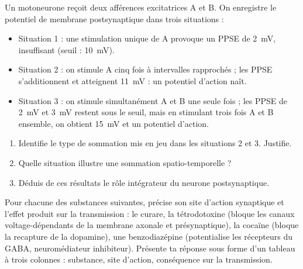 \documentclass[11pt]{article}
\newcounter{popsec}
\newcounter{popsub}
\newcommand{\courssub}[1]{%
  \stepcounter{popsub}%
  \par\vspace{9pt}\noindent{\popxbold\fontsize{11.5}{13}\selectfont\color{popink}{\color{poporange}\thepopsec.\thepopsub}\hspace{6pt}#1}\par\nopagebreak\vspace{4pt}
}
\begin{document}
\begin{exercice}
Un motoneurone reçoit deux afférences excitatrices A et B. On enregistre le potentiel de membrane postsynaptique dans trois situations :
\begin{itemize}
\item Situation 1 : une stimulation unique de A provoque un PPSE de \SI{2}{mV}, insuffisant (seuil : \SI{10}{mV}).
\item Situation 2 : on stimule A cinq fois à intervalles rapprochés ; les PPSE s'additionnent et atteignent \SI{11}{mV} : un potentiel d'action naît.
\item Situation 3 : on stimule simultanément A et B une seule fois ; les PPSE de \SI{2}{mV} et \SI{3}{mV} restent sous le seuil, mais en stimulant trois fois A et B ensemble, on obtient \SI{15}{mV} et un potentiel d'action.
\end{itemize}
\begin{enumerate}
\item Identifie le type de sommation mis en jeu dans les situations 2 et 3. Justifie.
\item Quelle situation illustre une sommation spatio-temporelle ?
\item Déduis de ces résultats le rôle intégrateur du neurone postsynaptique.
\end{enumerate}
\end{exercice}

\begin{exercice}
Pour chacune des substances suivantes, précise son site d'action synaptique et l'effet produit sur la transmission : le curare, la tétrodotoxine (bloque les canaux  voltage-dépendants de la membrane axonale et présynaptique), la cocaïne (bloque la recapture de la dopamine), une benzodiazépine (potentialise les récepteurs du GABA, neuromédiateur inhibiteur). Présente ta réponse sous forme d'un tableau à trois colonnes : substance, site d'action, conséquence sur la transmission.
\end{exercice}

\courssub{Je me prépare au Bac}
\end{document}
